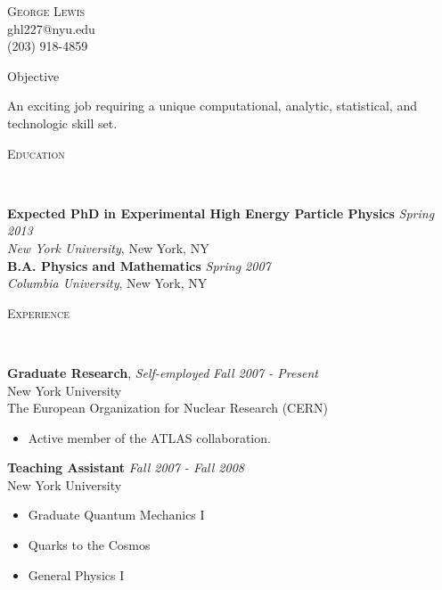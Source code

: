 \documentclass[9pt]{article}
\newenvironment{changemargin}[2]{%
  \begin{list}{}{%
    \setlength{\topsep}{0pt}%
    \setlength{\leftmargin}{#1}%
    \setlength{\rightmargin}{#2}%
    \setlength{\listparindent}{\parindent}%
    \setlength{\itemindent}{\parindent}%
    \setlength{\parsep}{\parskip}%
  }%
  \item[]}{\end{list}
}
\newcommand{\lineover}{
	\begin{changemargin}{-0.05in}{-0.05in}
		\vspace*{-8pt}
		\hrulefill \\
		\vspace*{-2pt}
	\end{changemargin}
}
\newcommand{\header}[1]{
	\begin{changemargin}{-0.5in}{-0.5in}
		\scshape{#1}\\
  	\lineover
	\end{changemargin}
}
\newcommand{\contact}[4]{
	\begin{changemargin}{-0.5in}{-0.5in}
		\begin{center}
			{\Large \scshape {#1}}\\ \smallskip
			{#2}\\ \smallskip 
			{#3}\\ \smallskip
			{#4}\smallskip
		\end{center}
	\end{changemargin}
}
\newenvironment{body} {
	\vspace*{-16pt}
	\begin{changemargin}{-0.25in}{-0.5in}
  }	
	{\end{changemargin}
}
\begin{document}
\contact{George Lewis}{ghl227@nyu.edu}{(203) 918-4859}


\header{Objective}

\begin{body}
	\vspace{14pt}
	An exciting job requiring a unique computational, analytic, statistical, and technologic skill set.
\end{body}

\smallskip


\header{Education}

\begin{body}
	\vspace{14pt}
	\textbf{Expected PhD in Experimental High Energy Particle Physics }{} \hfill \emph{Spring 2013}{} \\
	\emph{New York University}, New York, NY{} \\
  \medskip
	\textbf{B.A. Physics and Mathematics} \hfill \emph{Spring 2007} \\
	\emph{Columbia University}, New York, NY\\
\end{body}

\smallskip


\header{Experience}

\begin{body}
	\vspace{14pt}
	\textbf{Graduate Research}, \emph{Self-employed} \hfill \emph{Fall 2007 - Present}\\
	New York University \\
        The European Organization for Nuclear Research (CERN) \\
	\vspace*{-4pt}
	\begin{itemize} \itemsep -0pt  %
		\item Active member of the ATLAS collaboration.
	\end{itemize}

	\textbf {Teaching Assistant} \hfill \emph{Fall 2007 - Fall 2008}\\
        New York University \\
	\vspace*{-4pt}
	\begin{itemize} \itemsep -0pt
		\item Graduate Quantum Mechanics I
		\item Quarks to the Cosmos
                \item General Physics I
	\end{itemize}
\end{body}
\end{document}
